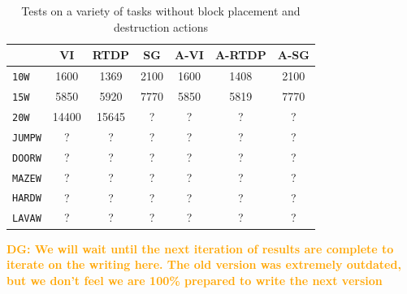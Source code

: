 \documentclass[]{article}
\newcommand{\dgnote}[1]{\textcolor{Orange}{\textbf{DG: #1}}}
\begin{document}
\begin{table}
\centering
\begin{tabular}{ l || c | c | c | c | c | c}
  & VI & RTDP & SG & A-VI & A-RTDP & A-SG \\
  \hline
  \texttt{10W} 		&	1600		& 1369 	&	2100		&	1600	 & 	1408 &	 2100 \\
  \texttt{15W} 		&	5850		& 5920 	&	7770 	&	5850	 & 	5819 &	 7770 \\
  \texttt{20W} 		&	14400	& 15645 	&	?	 	&	?	 & 	? 	&	?\\
  \texttt{JUMPW}  	&	?		& ? 		&	? 		&	?	 & 	? 	&	?\\
  \texttt{DOORW}  	&	?		& ? 		&	? 		&	?	 & 	? 	&	?\\
  \texttt{MAZEW}  	&	?		& ? 		&	? 		&	?	 & 	? 	&	?\\
  \texttt{HARDW} 	&	?		& ? 		&	? 		&	?	 & 	? 	&	?\\
  \texttt{LAVAW} 	&	?		& ? 		&	? 		&	?	 & 	? 	&	?\\
\end{tabular} 
\label{results_1}
\caption{Tests on a variety of tasks without block placement and destruction actions}
\end{table}

\dgnote{We will wait until the next iteration of results are complete to iterate on the writing here. The old
version was extremely outdated, but we don't feel we are 100\% prepared to write the next version}

%
%
\end{document}
